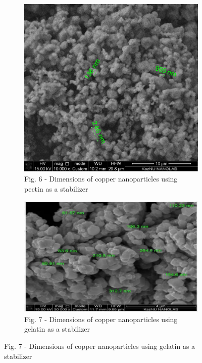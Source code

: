\begin{figure}[H]
    \centering
    \begin{subfigure}[b]{0.45\textwidth}
        \centering
        \includegraphics[width=\textwidth,height=\textwidth]{assets/19}
        \caption*{Fig. 6 - Dimensions of copper nanoparticles using pectin as a stabilizer}
    \end{subfigure}
    \hfill
    \begin{subfigure}[b]{0.45\textwidth}
        \centering
        \includegraphics[width=\textwidth,height=\textwidth]{assets/20}
        \caption*{Fig. 7 - Dimensions of copper nanoparticles using gelatin as a stabilizer}
    \end{subfigure}
\end{figure}

